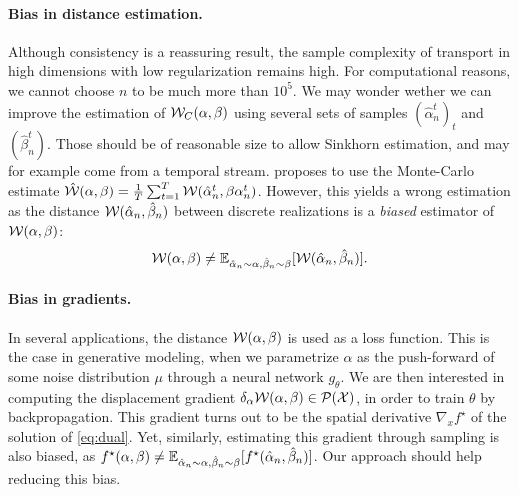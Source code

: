 \paragraph{Bias in distance estimation.} Although consistency is a reassuring
result, the sample complexity of transport in high dimensions with low
regularization remains high. For computational reasons, we cannot choose $n$ to
be much more than $10^5$. We may wonder wether we can improve the estimation of
$\mathcal{W}_{C}(\alpha,\beta)$ using several sets of samples $(\hat \alpha_n^t)_t$ and
$(\hat \beta_n^t)$. Those should be of reasonable size to allow Sinkhorn
estimation, and may for example come from a temporal stream.
\cite{2018-Genevay-aistats} proposes to use the Monte-Carlo estimate $\hat
{\mathcal{W}}(\alpha, \beta) = \frac{1}{T} \sum_{t=1}^T \mathcal{W}(\hat \alpha_n^t, \beta
\alpha_n^t)$. However, this yields a wrong estimation as the distance $\mathcal{W}(\hat
\alpha_n, \hat \beta_n)$ between discrete realizations is a \textit{biased}
estimator of $\mathcal{W}(\alpha, \beta)$:
\begin{equation}
    \mathcal{W}(\alpha, \beta) \neq 
    \mathbb{E}_{\hat \alpha_n \sim \alpha, \hat \beta_n \sim \beta} [\mathcal{W}(\hat \alpha_n, \hat \beta_n)].
\end{equation}

\paragraph{Bias in gradients.} In several applications, the distance
$\mathcal{W}(\alpha, \beta)$ is used as a loss function. This is the case in generative
modeling, when we parametrize $\alpha$ as the push-forward of some noise
distribution $\mu$ through a neural network $g_\theta$. We are then interested
in computing the displacement gradient $\delta_\alpha \mathcal{W}(\alpha, \beta) \in
\mathcal{P}(\mathcal{X})$, in order to train $\theta$ by backpropagation. This gradient turns
out to be the spatial derivative $\nabla_x f^\star$ of the solution of
\eqref{eq:dual}. Yet, similarly, estimating this gradient through sampling is
also biased, as $f^\star(\alpha, \beta) \neq \mathbb{E}_{\hat \alpha_n \sim \alpha,
\hat \beta_n \sim \beta}[f^\star(\hat \alpha_n, \hat \beta_n)]$.  Our approach
should help reducing this bias.

\hfill